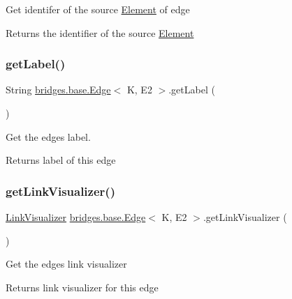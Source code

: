 Get identifer of the source \hyperlink{classbridges_1_1base_1_1_element}{Element} of edge

\begin{DoxyReturn}{Returns}
the identifier of the source \hyperlink{classbridges_1_1base_1_1_element}{Element} 
\end{DoxyReturn}
\mbox{\label{classbridges_1_1base_1_1_edge_a8663708d930e8df460c57d8bdbab44b2}} 
\subsubsection{\texorpdfstring{get\+Label()}{getLabel()}}
{\footnotesize\ttfamily String \hyperlink{classbridges_1_1base_1_1_edge}{bridges.\+base.\+Edge}$<$ K, E2 $>$.get\+Label (\begin{DoxyParamCaption}{ }\end{DoxyParamCaption})}



Get the edge\textquotesingle{}s label. 

\begin{DoxyReturn}{Returns}
label of this edge 
\end{DoxyReturn}
\mbox{\label{classbridges_1_1base_1_1_edge_a11c655622b8a54f2931f59b1d256f84a}} 
\subsubsection{\texorpdfstring{get\+Link\+Visualizer()}{getLinkVisualizer()}}
{\footnotesize\ttfamily \hyperlink{classbridges_1_1base_1_1_link_visualizer}{Link\+Visualizer} \hyperlink{classbridges_1_1base_1_1_edge}{bridges.\+base.\+Edge}$<$ K, E2 $>$.get\+Link\+Visualizer (\begin{DoxyParamCaption}{ }\end{DoxyParamCaption})}

Get the edge\textquotesingle{}s link visualizer \begin{DoxyReturn}{Returns}
link visualizer for this edge 
\end{DoxyReturn}
\mbox{\label{classbridges_1_1base_1_1_edge_a3431e83235fc5d5dd5cf747ed4853881}} 
